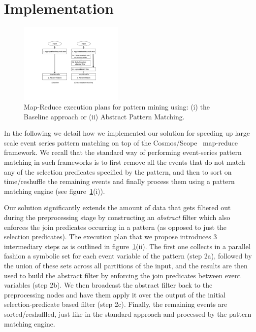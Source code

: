 \section{Implementation}
\label{sec:implementation}

\begin{figure}[tp]
\centering
\includegraphics[clip, trim=5.6cm 4.5cm 6.3cm 4.2cm, 
width=0.45\textwidth]{graphs/query_plan.pdf}
\caption{Map-Reduce execution plans for pattern mining using: (i) the Baseline 
approach or (ii) Abstract Pattern Matching.}
\label{fig:query_plan}
\end{figure}


In the following we detail how we implemented our solution for speeding up 
large scale event series pattern matching on top of the 
Cosmos/Scope~\cite{Chaiken:2008} map-reduce framework.
We recall that the standard way of performing event-series pattern matching in 
such frameworks is to first remove all the events that do not match any of the 
selection predicates specified by the pattern, and then to sort on 
time/reshuffle the remaining events and finally process them using a pattern 
matching engine (see figure~\ref{fig:query_plan}(i)).

Our solution significantly extends the amount of data that gets filtered out 
during the preprocessing stage by constructing an {\em abstract} filter which 
also enforces the join predicates occurring in a pattern (as opposed to just 
the selection predicates).
The execution plan that we propose introduces 3 intermediary steps as is 
outlined in figure~\ref{fig:query_plan}(ii).
The first one collects in a parallel fashion a symbolic set for each event 
variable of the pattern (step 2a), followed by the union of these sets across 
all partitions of the input, and the results are then used to build the 
abstract filter by enforcing the join predicates between event variables (step 
2b). 
We then broadcast the abstract filter back to the preprocessing nodes and have 
them apply it over the output of the initial selection-predicate based filter 
(step 2c). 
Finally, the remaining events are sorted/reshuffled, just like in the standard 
approach and processed by the pattern matching engine. 



